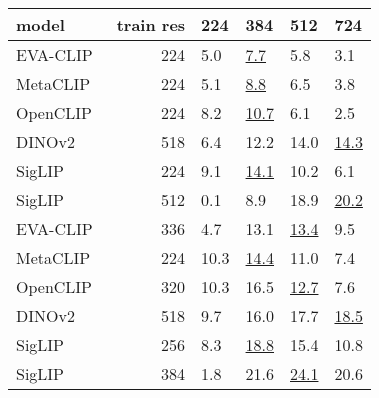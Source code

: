 \small
\begin{tabular}{lrCCCC}
\toprule
\textbf{model} & \textbf{train res} & \textbf{224} & \textbf{384} & \textbf{512} & \textbf{724} \\ 
\midrule
EVA-CLIP~\cite{evaclip,fwx+23}  & 224 & 5.0  & \underline{7.7}  & 5.8  &  3.1 \\
MetaCLIP~\cite{metaclip}        & 224 & 5.1  & \underline{8.8}  & 6.5  &  3.8 \\
OpenCLIP~\cite{convnext,iww+21} & 224 & 8.2  & \underline{10.7} & 6.1  &  2.5 \\
DINOv2~\cite{odm+24}            & 518 & 6.4  & 12.2 & 14.0 & \underline{14.3} \\
SigLIP~\cite{siglip}            & 224 & 9.1  & \underline{14.1} & 10.2 &  6.1 \\
SigLIP~\cite{siglip}            & 512 & 0.1  &  8.9 & 18.9 & \underline{20.2} \\ 
\midrule
EVA-CLIP~\cite{evaclip,fwx+23}  & 336 & 4.7  & 13.1 & \underline{13.4} &  9.5 \\
MetaCLIP~\cite{metaclip}        & 224 & 10.3 & \underline{14.4} & 11.0 &  7.4 \\
OpenCLIP~\cite{convnext,iww+21} & 320 & 10.3 & 16.5 & \underline{12.7} &  7.6 \\
DINOv2~\cite{odm+24}            & 518 & 9.7  & 16.0 & 17.7 & \underline{18.5} \\
SigLIP~\cite{siglip}            & 256 & 8.3  & \underline{18.8} & 15.4 & 10.8 \\ 
SigLIP~\cite{siglip}            & 384 & 1.8  & 21.6 & \underline{24.1} & 20.6 \\ 
\bottomrule
\end{tabular}